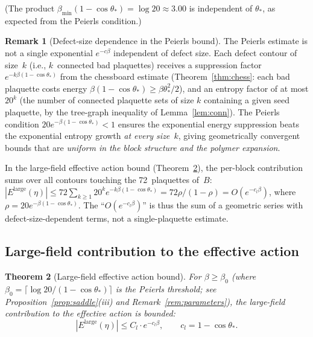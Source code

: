 \documentclass[11pt]{article}
\newtheorem{theorem}{Theorem}[section]
\theoremstyle{definition}
\newtheorem{remark}[theorem]{Remark}
\begin{document}
\noindent (The product $\beta_{\min}(1-\cos\theta_*)=\log 20\approx 3.00$
is independent of $\theta_*$, as expected from the Peierls condition.)

\begin{remark}[Defect-size dependence in the Peierls bound]%
\label{rem:peierls-size}
The Peierls estimate is not a single exponential $e^{-c\beta}$
independent of defect size.  Each defect contour of size~$k$ (i.e.,
$k$~connected bad plaquettes) receives a suppression factor
$e^{-k\beta(1-\cos\theta_*)}$ from the chessboard estimate
(Theorem~\ref{thm:chess}: each bad plaquette costs energy
$\beta(1-\cos\theta_*)\ge\beta\theta_*^2/2$), and an entropy factor
of at most $20^k$ (the number of connected plaquette sets of size $k$
containing a given seed plaquette, by the tree-graph inequality of
Lemma~\ref{lem:conn}).  The Peierls condition
$20e^{-\beta(1-\cos\theta_*)}<1$ ensures the exponential energy
suppression beats the exponential entropy growth \emph{at every
size~$k$}, giving geometrically convergent bounds that are
\emph{uniform in the block structure and the polymer expansion}.

In the large-field effective action bound
(Theorem~\ref{thm:largefield}), the per-block contribution sums
over all contours touching the 72~plaquettes of~$B$:
$|E^{\mathrm{large}}(\eta)|\le 72\sum_{k\ge 1}20^k
e^{-k\beta(1-\cos\theta_*)}
=72\rho/(1-\rho)=O(e^{-c_l\beta})$,
where $\rho=20e^{-\beta(1-\cos\theta_*)}$.
The ``$O(e^{-c_l\beta})$'' is thus the sum of a geometric series
with defect-size-dependent terms, not a single-plaquette estimate.
\end{remark}

\subsection{Large-field contribution to the effective action}
\label{subsec:LFeff}

\begin{theorem}[Large-field effective action bound]\label{thm:largefield}
For $\beta\ge\beta_0$ (where $\beta_0=\lceil\log 20/(1-\cos\theta_*)\rceil$
is the Peierls threshold; see Proposition~\ref{prop:saddle}(iii)
and Remark~\ref{rem:parameters}), the large-field contribution to the
effective action is bounded:
\begin{equation}
|E^{\mathrm{large}}(\eta)|\le C_l\cdot e^{-c_l\beta},
\qquad c_l=1-\cos\theta_*.
\end{equation}
\end{theorem}
\end{document}
